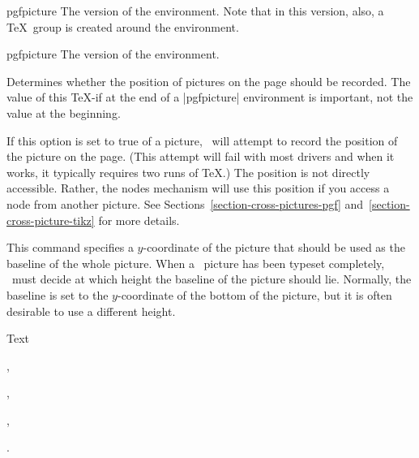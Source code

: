 \begin{plainenvironment}{{pgfpicture}}
    The  version of the environment. Note that in this version,
    also, a \TeX\ group is created around the environment.
\end{plainenvironment}

\begin{contextenvironment}{{pgfpicture}}
    The  version of the environment.
\end{contextenvironment}

{\let\ifpgfrememberpicturepositiononpage=\relax
\begin{command}{\ifpgfrememberpicturepositiononpage}
    Determines whether the position of pictures on the page should be recorded.
    The value of this \TeX-if at the end of a |{pgfpicture}| environment is
    important, not the value at the beginning.

    If this option is set to true of a picture, \pgfname\ will attempt to
    record the position of the picture on the page. (This attempt will fail
    with most drivers and when it works, it typically requires two runs of
    \TeX.) The position is not directly accessible. Rather, the nodes mechanism
    will use this position if you access a node from another picture. See
    Sections~\ref{section-cross-pictures-pgf}
    and~\ref{section-cross-picture-tikz} for more details.
\end{command}
}

\makeatletter
\begin{command}{\pgfsetbaseline{}}
    This command specifies a $y$-coordinate of the picture that should be used
    as the baseline of the whole picture. When a \pgfname\ picture has been
    typeset completely, \pgfname\ must decide at which height the baseline of
    the picture should lie. Normally, the baseline is set to the $y$-coordinate
    of the bottom of the picture, but it is often desirable to use a different
    height.
\begin{codeexample}[]
Text
\begin{pgfpicture}
  \pgfpathcircle{\pgfpointorigin}{1ex}
\end{pgfpicture},
\begin{pgfpicture}
  \pgfsetbaseline{0pt}
  \pgfpathcircle{\pgfpointorigin}{1ex}
\end{pgfpicture},
\begin{pgfpicture}
  \pgfsetbaseline{.5ex}
  \pgfpathcircle{\pgfpointorigin}{1ex}
\end{pgfpicture},
\begin{pgfpicture}
  \pgfsetbaseline{-1ex}
  \pgfpathcircle{\pgfpointorigin}{1ex}
\end{pgfpicture}.
\end{codeexample}
\end{command}

